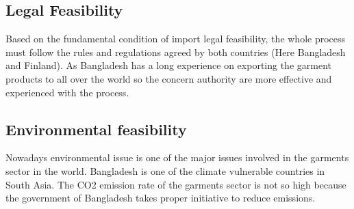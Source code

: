 \subsection{Legal Feasibility}
Based on the fundamental condition of import legal feasibility, the whole process must follow the rules and regulations agreed by both countries (Here Bangladesh and Finland). As Bangladesh has a long experience on exporting the garment products to all over the world  so the concern authority are more effective and experienced with the process.
\subsection{Environmental feasibility}
Nowadays environmental issue is one of the major issues involved in the garments sector in the world. Bangladesh is one of the climate vulnerable countries in South Asia. The CO2 emission rate of the garments sector is not so high because the government of Bangladesh takes proper initiative to reduce emissions.